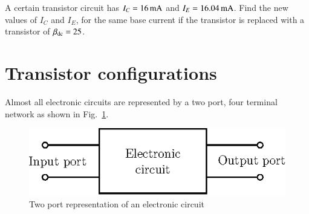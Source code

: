 \medskip

\begin{example}\label{exam3.9}
A certain transistor circuit has $I_{C}=16\text{\,mA}$ and $I_{E}=16.04\text{\,mA}$. Find the new values of $I_{C}$ and $I_{E}$, for the same base current if the transistor is replaced with a transistor of $\beta_{\operatorname{dc}}=25$.
\end{example}


\eject

\section{Transistor configurations}\label{sec3.13}

Almost all electronic circuits are represented by a two port, four terminal network as shown in Fig.~\ref{fig3.13}.
\begin{figure}[H]
\centering
\includegraphics{chap2/fig2.13.eps}
\caption{Two port representation of an electronic circuit}\label{fig3.13}
\end{figure}

